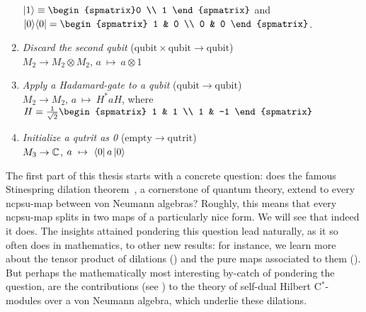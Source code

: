 \begin{parsec}
\begin{point}
\begin{point}
\begin{enumerate}
{            $\ket{1}\equiv\begin{spmatrix}0 \\ 1 \end{spmatrix}$ and
                $\ketbra{0}{0} = \begin{spmatrix} 1 & 0
                \\ 0 & 0 \end{spmatrix}$.}
\item
    \emph{Discard the second qubit} \quad
            ($\mathrm{qubit} \times \mathrm{qubit}\to \mathrm{qubit}$) \\
        $M_2 \rightarrow M_2 \otimes M_2$, \quad
        $a \ \mapsto \ a \otimes 1$
\item
    \emph{Apply a Hadamard-gate to a qubit} \quad
            ($\mathrm{qubit} \to \mathrm{qubit}$) \\
        $M_2 \rightarrow M_2$, \quad
        $a \ \mapsto \ H^*a H $, \quad where~$H = \frac{1}{\sqrt{2}}\begin{spmatrix}
            1 & 1 \\ 1 & -1
        \end{spmatrix}$
\item
    \emph{Initialize a qutrit as 0} \quad
            ($\mathrm{empty} \to \mathrm{qutrit}$) \\
        $M_3 \rightarrow \mathbb{C}$, \quad
        $a \ \mapsto \ \bra{0}a\ket{0}$
\end{enumerate}
\end{point}
\begin{point}%
The first part of this thesis starts with a concrete question:
    does the famous  Stinespring dilation theorem~\cite{stinespring},
    a cornerstone of quantum theory,
    extend to every ncpsu-map between von Neumann algebras?
Roughly, this means that every ncpsu-map  splits
    in two maps of a particularly nice form.
We will see that indeed it does.
The insights attained pondering this question lead naturally,
        as it so often does in mathematics, to other new results:
    for instance, we learn more about  the tensor product of
    dilations ()
        and the pure maps associated to them ().
But perhaps the mathematically
    most interesting by-catch of pondering the question,
    are the contributions (see ) to the theory
    of self-dual Hilbert C$^*$-modules over a von Neumann algebra,
    which underlie these dilations.
\end{point}
\begin{point}%

\end{point}
\end{point}
\end{parsec}
